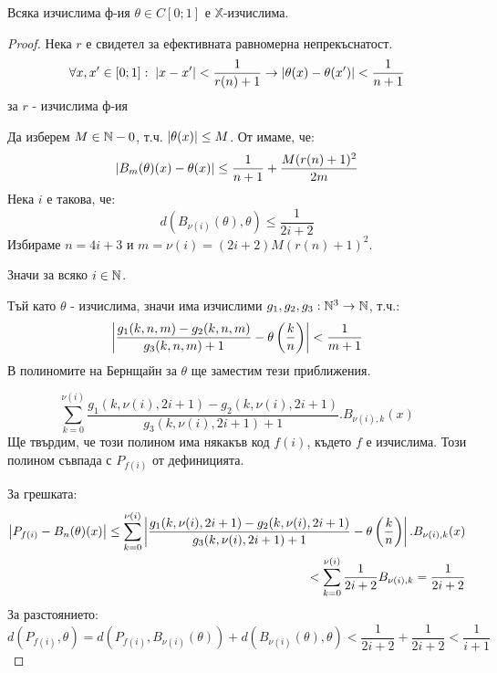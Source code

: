 \begin{theorem}
    Всяка изчислима ф-ия $\theta \in C[0; 1]$ е $\mathbb X$-изчислима.
\end{theorem}
\begin{proof}
    Нека $r$ е свидетел за ефективната равномерна непрекъснатост.
    \begin{equation}
        \forall x, x' \in [0;1]:\; \left|x - x'\right| < \frac{1}{r(n) + 1} \rightarrow \left|\theta(x) - \theta(x')\right| < \frac{1}{n+1}
    \end{equation}
    за $r$ - изчислима ф-ия

    Да изберем $M \in {\mathbb{N}} - {0}$, т.ч. $\left|\theta(x)\right| \leq M$. От  имаме, че:
    \begin{equation}
        \left|B_m(\theta)(x) - \theta(x)\right| \leq \frac{1}{n+1} + \frac{M(r(n) + 1)^2}{2m}
    \end{equation}
    Нека $i$ е такова, че:
    \begin{equation}
        d(B_{\nu(i)}(\theta), \theta) \leq \frac{1}{2i+2}
    \end{equation}
    Избираме $n = 4i + 3$ и $m = \nu(i) = (2i+2)M(r(n) +1)^2$.

    Значи за всяко $i \in {\mathbb{N}}$.

    Тъй като $\theta$ - изчислима, значи има изчислими $g_1, g_2, g_3 : {\mathbb{N}}^3 \to {\mathbb{N}}$, т.ч.:
    \begin{equation}
        \left|\frac{g_1(k, n, m) - g_2(k, n, m)}{g_3(k,n,m) + 1} - \theta\left(\frac{k}{n}\right)\right| < \frac{1}{m+1}
    \end{equation}
    В полиномите на Бернщайн за $\theta$ ще заместим тези приближения.

    \begin{equation}
        \sum_{k=0}^{\nu(i)} \frac{g_1(k, \nu(i), 2i+1) - g_2(k, \nu(i), 2i+1)}{g_3(k, \nu(i), 2i+1) + 1} . B_{\nu(i), k}(x)
    \end{equation}
    Ще твърдим, че този полином има някакъв код $f(i)$, където $f$ е изчислима. Този полином съвпада с $P_{f(i)}$ от дефиницията.

    За грешката:
    \begin{equation}
        \begin{split}
            \left|P_{f(i)} - B_{n}(\theta)(x)\right| \leq \sum_{k=0}^{\nu(i)} \left|\frac{g_1(k, \nu(i), 2i+1) - g_2(k, \nu(i), 2i+1)}{g_3(k, \nu(i), 2i+1) + 1} - \theta\left(\frac{k}{n}\right)\right|.B_{\nu(i),k}(x) \\
            < \sum_{k=0}^{\nu(i)} \frac{1}{2i+2}B_{\nu(i), k} = \frac{1}{2i+2}
        \end{split}
    \end{equation}
    За разстоянието:
    \begin{equation}
        d(P_{f(i)}, \theta) = d(P_{f(i)}, B_{\nu(i)}(\theta)) + d(B_{\nu(i)}(\theta), \theta) < \frac{1}{2i+2} + \frac{1}{2i+2} < \frac{1}{i+1}
    \end{equation}
\end{proof}

